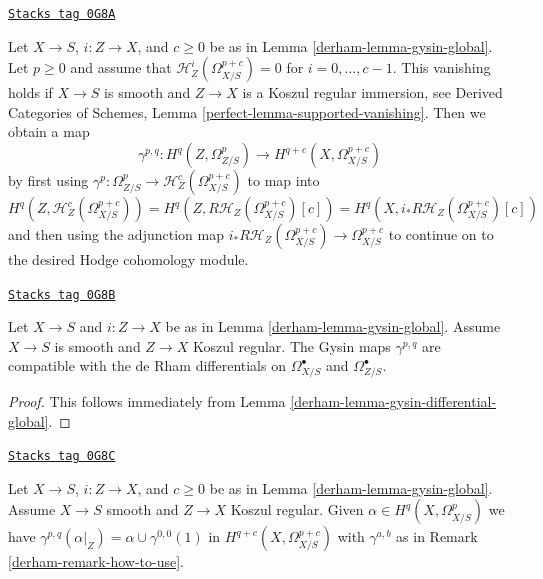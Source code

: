\begin{remark}
\label{derham-remark-how-to-use}
\href{https://stacks.math.columbia.edu/tag/0G8A}{\texttt{Stacks tag 0G8A}}

Let $X \to S$, $i : Z \to X$, and $c \geq 0$ be as in
Lemma \ref{derham-lemma-gysin-global}.
Let $p \geq 0$ and assume that $\mathcal{H}^i_Z(\Omega^{p + c}_{X/S}) = 0$
for $i = 0, \ldots, c - 1$. This vanishing holds if $X \to S$ is smooth
and $Z \to X$ is a Koszul regular immersion, see
Derived Categories of Schemes, Lemma \ref{perfect-lemma-supported-vanishing}.
Then we obtain a map
$$
\gamma^{p, q} :
H^q(Z, \Omega^p_{Z/S})
\longrightarrow
H^{q + c}(X, \Omega^{p + c}_{X/S})
$$
by first using
$\gamma^p : \Omega^p_{Z/S} \to \mathcal{H}^c_Z(\Omega^{p + c}_{X/S})$
to map into
$$
H^q(Z, \mathcal{H}^c_Z(\Omega^{p + c}_{X/S})) =
H^q(Z, R\mathcal{H}_Z(\Omega^{p + c}_{X/S})[c]) =
H^q(X, i_*R\mathcal{H}_Z(\Omega^{p + c}_{X/S})[c])
$$
and then using the adjunction map
$i_*R\mathcal{H}_Z(\Omega^{p + c}_{X/S}) \to \Omega^{p + c}_{X/S}$
to continue on to the desired Hodge cohomology module.
\end{remark}

\begin{lemma}
\label{derham-lemma-gysin-differential-hodge}
\href{https://stacks.math.columbia.edu/tag/0G8B}{\texttt{Stacks tag 0G8B}}

Let $X \to S$ and $i : Z \to X$ be as in Lemma \ref{derham-lemma-gysin-global}.
Assume $X \to S$ is smooth and $Z \to X$ Koszul regular.
The Gysin maps $\gamma^{p, q}$ are compatible with the de Rham
differentials on $\Omega^\bullet_{X/S}$ and $\Omega^\bullet_{Z/S}$.
\end{lemma}

\begin{proof}

This follows immediately from
Lemma \ref{derham-lemma-gysin-differential-global}.
\end{proof}

\begin{lemma}
\label{derham-lemma-gysin-projection-global}
\href{https://stacks.math.columbia.edu/tag/0G8C}{\texttt{Stacks tag 0G8C}}

Let $X \to S$, $i : Z \to X$, and $c \geq 0$ be as in
Lemma \ref{derham-lemma-gysin-global}. Assume $X \to S$ smooth and
$Z \to X$ Koszul regular. Given $\alpha \in H^q(X, \Omega^p_{X/S})$ we have
$\gamma^{p, q}(\alpha|_Z) = \alpha \cup \gamma^{0, 0}(1)$ in
$H^{q + c}(X, \Omega^{p + c}_{X/S})$ with $\gamma^{a, b}$ as in
Remark \ref{derham-remark-how-to-use}.
\end{lemma}

